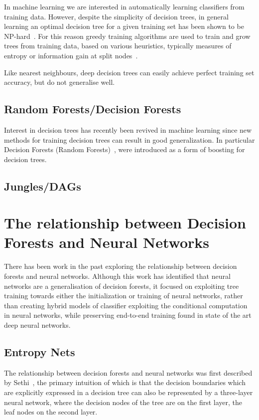 \documentclass[thesis]{subfiles}
\begin{document}
In machine learning we are interested in automatically learning classifiers from training data. However, despite the simplicity of decision trees, in general learning an optimal decision tree for a given training set has been shown to be NP-hard~\cite{journals/iandc/HancockJLT96}. For this reason greedy training algorithms are used to train and grow trees from training data, based on various heuristics, typically measures of entropy or information gain at split nodes~\cite{breiman84}. 

Like nearest neighbours, deep decision trees can easily achieve perfect training set accuracy, but do not generalise well. 

\subsection{Random Forests/Decision Forests}
Interest in decision trees has recently been revived in machine learning since new methods for training decision trees can result in good generalization. In particular Decision Forests (Random Forests)~\cite{journals/neco/AmitG97,breiman2001random}, were introduced as a form of boosting for decision trees.
\subsection{Jungles/DAGs}

\section{The relationship between Decision Forests and Neural Networks}
There has been work in the past exploring the relationship between decision forests and neural networks. Although this work has identified that neural networks are a generalisation of decision forests, it focused on exploiting tree training towards either the initialization or training of neural networks, rather than creating hybrid models of classifier exploiting the conditional computation in neural networks, while preserving end-to-end training found in state of the art deep neural networks.


\subsection{Entropy Nets}
The relationship between decision forests and neural networks was first described by Sethi~\cite{Sethi1990}, the primary intuition of which is that the decision boundaries which are explicitly expressed in a decision tree can also be represented by a three-layer neural network, where the decision nodes of the tree are on the first layer, the leaf nodes on the second layer.
\end{document}
